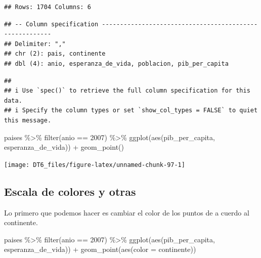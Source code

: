 \documentclass[
  openany]{book}
\newenvironment{Shaded}{\begin{snugshade}}{\end{snugshade}}
\newcommand{\AttributeTok}[1]{\textcolor[rgb]{0.77,0.63,0.00}{#1}}
\newcommand{\DecValTok}[1]{\textcolor[rgb]{0.00,0.00,0.81}{#1}}
\newcommand{\FunctionTok}[1]{\textcolor[rgb]{0.00,0.00,0.00}{#1}}
\newcommand{\NormalTok}[1]{#1}
\newcommand{\SpecialCharTok}[1]{\textcolor[rgb]{0.00,0.00,0.00}{#1}}
\begin{document}
\begin{verbatim}
## Rows: 1704 Columns: 6
\end{verbatim}

\begin{verbatim}
## -- Column specification --------------------------------------------------------
## Delimiter: ","
## chr (2): pais, continente
## dbl (4): anio, esperanza_de_vida, poblacion, pib_per_capita
\end{verbatim}

\begin{verbatim}
## 
## i Use `spec()` to retrieve the full column specification for this data.
## i Specify the column types or set `show_col_types = FALSE` to quiet this message.
\end{verbatim}

\begin{Shaded}
\begin{Highlighting}[]
\NormalTok{paises }\SpecialCharTok{\%\textgreater{}\%} 
  \FunctionTok{filter}\NormalTok{(anio }\SpecialCharTok{==} \DecValTok{2007}\NormalTok{) }\SpecialCharTok{\%\textgreater{}\%} 
  \FunctionTok{ggplot}\NormalTok{(}\FunctionTok{aes}\NormalTok{(pib\_per\_capita, esperanza\_de\_vida)) }\SpecialCharTok{+}
  \FunctionTok{geom\_point}\NormalTok{()}
\end{Highlighting}
\end{Shaded}

\begin{center}\texttt{[image: DT6\_files/figure-latex/unnamed-chunk-97-1]} \end{center}

\hypertarget{escala-de-colores-y-otras}{%
\subsection{Escala de colores y otras}\label{escala-de-colores-y-otras}}

Lo primero que podemos hacer es cambiar el color de los puntos de a cuerdo al continente.

\begin{Shaded}
\begin{Highlighting}[]
\NormalTok{paises }\SpecialCharTok{\%\textgreater{}\%} 
  \FunctionTok{filter}\NormalTok{(anio }\SpecialCharTok{==} \DecValTok{2007}\NormalTok{) }\SpecialCharTok{\%\textgreater{}\%} 
  \FunctionTok{ggplot}\NormalTok{(}\FunctionTok{aes}\NormalTok{(pib\_per\_capita, esperanza\_de\_vida)) }\SpecialCharTok{+}
  \FunctionTok{geom\_point}\NormalTok{(}\FunctionTok{aes}\NormalTok{(}\AttributeTok{color =}\NormalTok{ continente))}
\end{Highlighting}
\end{Shaded}
\end{document}
